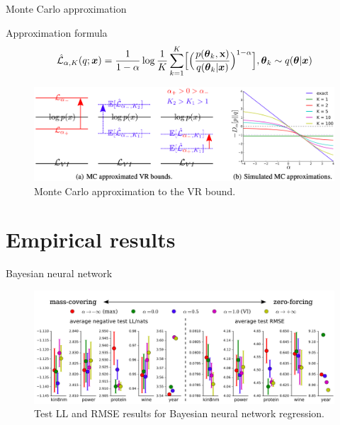 \documentclass{beamer}
\begin{document}
\begin{frame}{Monte Carlo approximation}
\begin{block}{Approximation formula}
    \begin{equation}
        \hat{\mathcal{L}}_{\alpha, K} (q; \boldsymbol{x}) = \dfrac{1}{1-\alpha}  \log \dfrac1K \sum\limits_{k=1}^K \Bigl[ { \Bigl( \dfrac{p(\boldsymbol{\theta}_k, \textbf{x}) }{q(\boldsymbol{\theta}_k | \boldsymbol{x} )} \Bigr)^{1-\alpha} } \Bigr],
        \boldsymbol{\theta}_k \sim q(\boldsymbol{\theta} | \boldsymbol{x})
    \end{equation}

\end{block}

        \begin{figure}
        \centering
        \includegraphics[scale=0.23]{mc.png}
        \caption{Monte Carlo approximation to the VR bound.}
        \label{fig:enter-label2}
    \end{figure}
\end{frame}

\section{Empirical results}
\begin{frame}{Bayesian neural network}
    \begin{figure}
        \centering
        \includegraphics[scale=0.24]{bnn.png}
        \caption{Test LL and RMSE results for Bayesian neural network regression.}
        \label{fig:enter-label3}
    \end{figure}
\end{frame}
\end{document}
